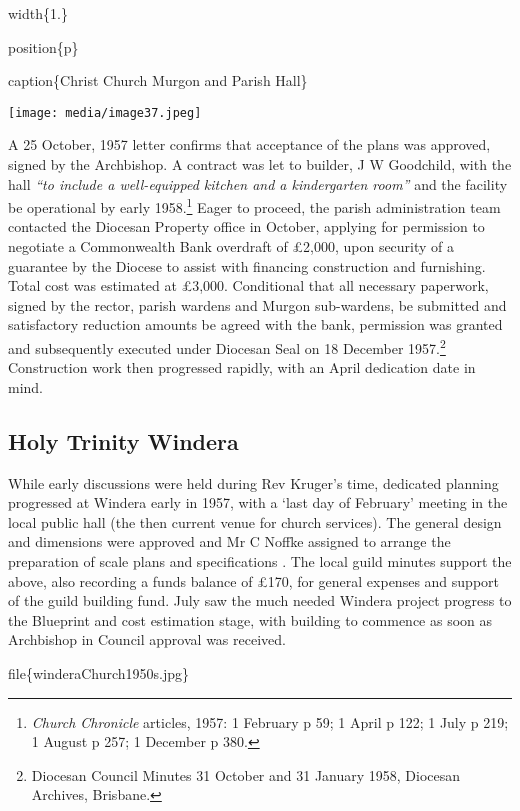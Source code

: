 width\{1.\}

position\{p\}

caption\{Christ Church Murgon and Parish Hall\}

\texttt{[image: media/image37.jpeg]}

A 25 October, 1957 letter confirms that acceptance of the plans was approved, signed by the Archbishop. A contract was let to builder, J W Goodchild, with the hall \emph{``to include a well-equipped kitchen and a kindergarten room''} and the facility be operational by early 1958.\footnote{\emph{Church Chronicle} articles, 1957: 1 February p 59; 1 April p 122; 1 July p 219; 1 August p 257; 1 December p 380.} Eager to proceed, the parish administration team contacted the Diocesan Property office in October, applying for permission to negotiate a Commonwealth Bank overdraft of £2,000, upon security of a guarantee by the Diocese to assist with financing construction and furnishing. Total cost was estimated at £3,000. Conditional that all necessary paperwork, signed by the rector, parish wardens and Murgon sub-wardens, be submitted and satisfactory reduction amounts be agreed with the bank, permission was granted and subsequently executed under Diocesan Seal on 18 December 1957.\footnote{Diocesan Council Minutes 31 October and 31 January 1958, Diocesan Archives, Brisbane.} Construction work then progressed rapidly, with an April dedication date in mind.

\hypertarget{holy-trinity-windera}{%
\subsection{Holy Trinity Windera}\label{holy-trinity-windera}}

While early discussions were held during Rev Kruger's time, dedicated planning progressed at Windera early in 1957, with a `last day of February' meeting in the local public hall (the then current venue for church services). The general design and dimensions were approved and Mr C Noffke assigned to arrange the preparation of scale plans and specifications . The local guild minutes support the above, also recording a funds balance of £170, for general expenses and support of the guild building fund. July saw the much needed Windera project progress to the Blueprint and cost estimation stage, with building to commence as soon as Archbishop in Council approval was received.

file\{winderaChurch1950s.jpg\}


